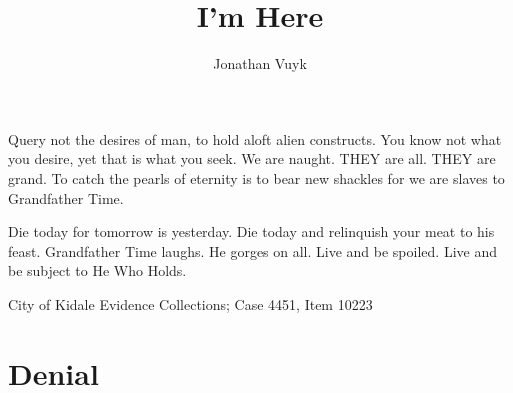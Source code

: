 \documentclass[9pt]{memoir}
\title{I'm Here}
\author{Jonathan Vuyk}
\date{}
\begin{document}
\pagecolor{black}
\color{gray}

\clearpage
\maketitle
\thispagestyle{empty}




\frontmatter


\begin{displayquote}

    Query not the desires of man, to hold aloft alien constructs. You know not what you desire, yet that is what you seek. We are naught. THEY are all. THEY are grand. To catch the pearls of eternity is to bear new shackles for we are slaves to Grandfather Time.

    Die today for tomorrow is yesterday. Die today and relinquish your meat to his feast. Grandfather Time laughs. He gorges on all. Live and be spoiled. Live and be subject to He Who Holds.

\end{displayquote}

\begin{flushright}

    City of Kidale Evidence Collections; Case 4451, Item 10223 \hspace{2em}

\end{flushright}


\mainmatter

\chapter*{Denial}
\end{document}
